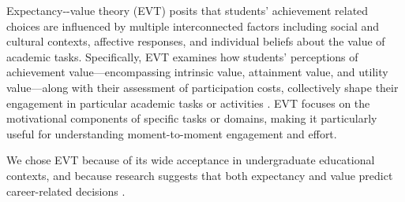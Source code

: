 Expectancy‑-value theory (EVT) \citep{wigfieldExpectancyvalueTheory2009} posits that students' achie\-vement related choices are influenced by multiple interconnected factors including social and cultural contexts, affective responses, and individual beliefs about the value of academic tasks. Specifically, EVT examines how students' perceptions of achievement value---encompassing intrinsic value, attainment value, and utility value---along with their assessment of participation costs, collectively shape their engagement in particular academic tasks or activities \citep{ecclesMotivationalBeliefsValues2002,wigfieldDevelopmentCompetenceBeliefs2002,wigfieldExpectancyvalueTheory2009}. EVT focuses on the motivational components of specific tasks or domains, making it particularly useful for understanding moment-to-moment engagement and effort.

We chose EVT because of its wide acceptance in undergraduate educational contexts, and because research suggests that both expectancy and value predict career-related decisions \citep{renningerCambridgeHandbookMotivation2019}.